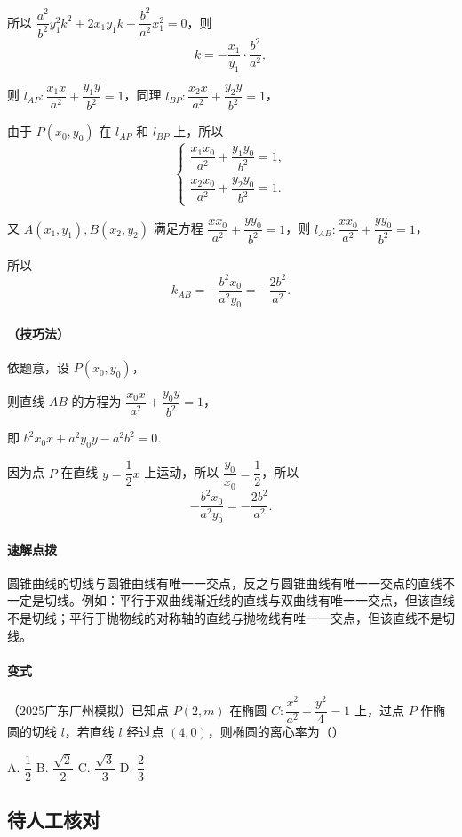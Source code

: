 \documentclass[UTF8,a4paper,11pt]{ctexart}
\begin{document}
所以 $\dfrac{a^2}{b^2}y_1^2k^2+2x_1y_1k+\dfrac{b^2}{a^2}x_1^2=0$，则
\[
k=-\frac{x_1}{y_1}\cdot \frac{b^2}{a^2},
\]

则 $l_{AP}:\dfrac{x_1x}{a^2}+\dfrac{y_1y}{b^2}=1$，同理 $l_{BP}:\dfrac{x_2x}{a^2}+\dfrac{y_2y}{b^2}=1$，

由于 $P(x_0,y_0)$ 在 $l_{AP}$ 和 $l_{BP}$ 上，所以
\[
\begin{cases}
\dfrac{x_1x_0}{a^2}+\dfrac{y_1y_0}{b^2}=1,\\
\dfrac{x_2x_0}{a^2}+\dfrac{y_2y_0}{b^2}=1.
\end{cases}
\]

又 $A(x_1,y_1),B(x_2,y_2)$ 满足方程 $\dfrac{xx_0}{a^2}+\dfrac{yy_0}{b^2}=1$，则 $l_{AB}:\dfrac{xx_0}{a^2}+\dfrac{yy_0}{b^2}=1$，

所以
\[
k_{AB}=-\frac{b^2x_0}{a^2y_0}=-\frac{2b^2}{a^2}.
\]

\paragraph{（技巧法）}依题意，设 $P(x_0,y_0)$，

则直线 $AB$ 的方程为 $\dfrac{x_0x}{a^2}+\dfrac{y_0y}{b^2}=1$，

即 $b^2x_0x+a^2y_0y-a^2b^2=0$.

因为点 $P$ 在直线 $y=\dfrac{1}{2}x$ 上运动，所以 $\dfrac{y_0}{x_0}=\dfrac{1}{2}$，所以
\[
-\frac{b^2x_0}{a^2y_0}=-\frac{2b^2}{a^2}.
\]

\paragraph{速解点拨}圆锥曲线的切线与圆锥曲线有唯一一交点，反之与圆锥曲线有唯一一交点的直线不一定是切线。例如：平行于双曲线渐近线的直线与双曲线有唯一一交点，但该直线不是切线；平行于抛物线的对称轴的直线与抛物线有唯一一交点，但该直线不是切线。

\paragraph{变式}（2025广东广州模拟）已知点 $P(2,m)$ 在椭圆 $C: \dfrac{x^2}{a^2}+\dfrac{y^2}{4}=1$ 上，过点 $P$ 作椭圆的切线 $l$，若直线 $l$ 经过点 $(4,0)$，则椭圆的离心率为（\qquad）

A. $\dfrac{1}{2}$ \qquad B. $\dfrac{\sqrt{2}}{2}$ \qquad C. $\dfrac{\sqrt{3}}{3}$ \qquad D. $\dfrac{2}{3}$

\subsection*{待人工核对}
\end{document}
